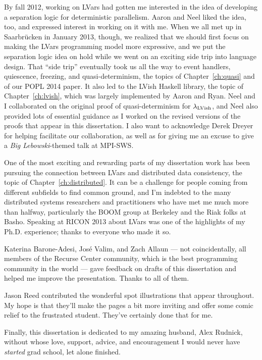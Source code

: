 By fall 2012, working on LVars had gotten me interested in the idea of
developing a separation logic for deterministic parallelism.  Aaron
and Neel liked the idea, too, and expressed interest in working on it
with me.  When we all met up in Saarbr{\"u}cken in January 2013,
though, we realized that we should first focus on making the LVars
programming model more expressive, and we put the separation logic
idea on hold while we went on an exciting side trip into language
design.  That ``side trip'' eventually took us all the way to event
handlers, quiescence, freezing, and quasi-determinism, the topics of
Chapter~\ref{ch:quasi} and of our POPL 2014 paper.  It also led to the
LVish Haskell library, the topic of Chapter~\ref{ch:lvish}, which was
largely implemented by Aaron and Ryan.  Neel and I collaborated on the
original proof of quasi-determinism for $\lambda_{\textrm{LVish}}$, and Neel also
provided lots of essential guidance as I worked on the revised
versions of the proofs that appear in this dissertation.  I also want
to acknowledge Derek Dreyer for helping facilitate our collaboration,
as well as for giving me an excuse to give a \emph{Big
Lebowski}-themed talk at MPI-SWS.

One of the most exciting and rewarding parts of my dissertation work
has been pursuing the connection between LVars and distributed data
consistency, the topic of Chapter~\ref{ch:distributed}.  It can be a
challenge for people coming from different subfields to find common
ground, and I'm indebted to the many distributed systems researchers
and practitioners who have met me much more than halfway, particularly
the BOOM group at Berkeley and the Riak folks at Basho.  Speaking at
RICON 2013 about LVars was one of the highlights of my
Ph.D. experience; thanks to everyone who made it so.

Katerina Barone-Adesi, Jos\'{e} Valim, and Zach Allaun --- not
coincidentally, all members of the Recurse Center community, which is
the best programming community in the world --- gave feedback on
drafts of this dissertation and helped me improve the presentation.
Thanks to all of them.

Jason Reed contributed the wonderful spot illustrations that appear
throughout.  My hope is that they'll make the pages a bit more
inviting and offer some comic relief to the frustrated student.
They've certainly done that for me.

Finally, this dissertation is dedicated to my amazing husband, Alex
Rudnick, without whose love, support, advice, and encouragement I
would never have \emph{started} grad school, let alone finished.
